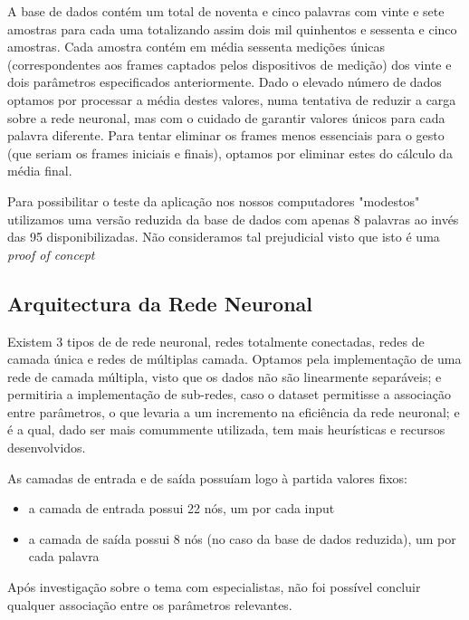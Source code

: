 \documentclass[10pt,a4paper]{article}
\begin{document}
A base de dados contém um total de noventa e cinco palavras com vinte e sete amostras para cada uma totalizando assim dois mil quinhentos e sessenta e cinco amostras.
Cada amostra contém em média sessenta medições únicas (correspondentes aos frames captados pelos dispositivos de medição) dos vinte e dois parâmetros especificados anteriormente.
Dado o elevado número de dados optamos por processar a média destes valores, numa tentativa de reduzir a carga sobre a rede neuronal, mas com o cuidado de garantir valores únicos para cada palavra diferente. Para tentar eliminar os frames menos essenciais para o gesto (que seriam os frames iniciais e finais), optamos por eliminar estes do cálculo da média final.

Para possibilitar o teste da aplicação nos nossos computadores "modestos" utilizamos uma versão reduzida da base de dados com apenas 8 palavras ao invés das 95 disponibilizadas. Não consideramos tal prejudicial visto que isto é uma \textit{proof of concept}

\subsection{Arquitectura da Rede Neuronal}

Existem 3 tipos de de rede neuronal, redes totalmente conectadas, redes de camada única e redes de múltiplas camada.
Optamos pela implementação de uma rede de camada múltipla, visto que os dados não são linearmente separáveis; e permitiria a implementação de sub-redes, caso o dataset permitisse a associação entre parâmetros, o que levaria a um incremento na eficiência da rede neuronal; e é a qual, dado ser mais comummente utilizada, tem mais heurísticas e recursos desenvolvidos.

As camadas de entrada e de saída possuíam logo à partida valores fixos:
\begin{itemize}
\item a camada de entrada possui 22 nós, um por cada input
\item a camada de saída possui 8 nós (no caso da base de dados reduzida), um por cada palavra
\end{itemize}

Após investigação sobre o tema com especialistas, não foi possível concluir qualquer associação entre os parâmetros relevantes.
\end{document}
